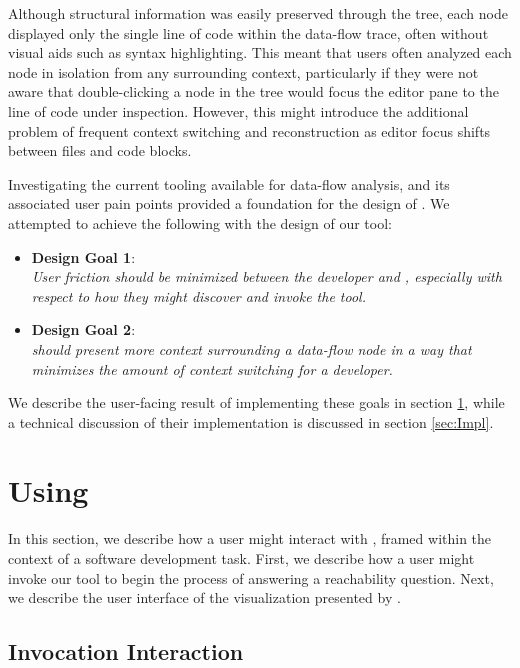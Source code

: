 \par Although structural information was easily preserved through the tree, each node
displayed only the single line of code within the data-flow trace, often
without visual aids such as syntax highlighting.
This meant that users often analyzed each node in isolation from any surrounding
context, particularly if they were not aware that double-clicking a node in the
tree would focus the editor pane to the line of code under inspection.
However, this might introduce the additional problem of frequent context
switching and reconstruction as editor focus shifts between files and code
blocks.

\par Investigating the current tooling available for data-flow analysis, and
its associated user pain points provided a foundation for the design of 
\toolname{}.
We attempted to achieve the following with the design of our tool:

\begin{itemize}
  \item[] \textbf{Design Goal 1}: \\
    \textit{
      User friction should be minimized between the developer and \toolname{},
      especially with respect to how they might discover and invoke the tool.
    }
  \item[] \textbf{Design Goal 2}: \\
  \textit{
    \toolname{} should present more context surrounding a data-flow node in
      a way that minimizes the amount of context switching for a developer.
  }
\end{itemize}

We describe the user-facing result of implementing these goals in section
\ref{sec:UsingReachHover}, while a technical discussion of their implementation 
is discussed in section \ref{sec:Impl}.

\section{Using \toolname{}}
\label{sec:UsingReachHover}

In this section, we describe how a user might interact with \toolname{}, framed
within the context of a software development task.
First, we describe how a user might invoke our tool to begin the process
of answering a reachability question.
Next, we describe the user interface of the visualization presented by 
\toolname{}.

\subsection{Invocation Interaction}
\label{subsection:InvocationInteraction}

